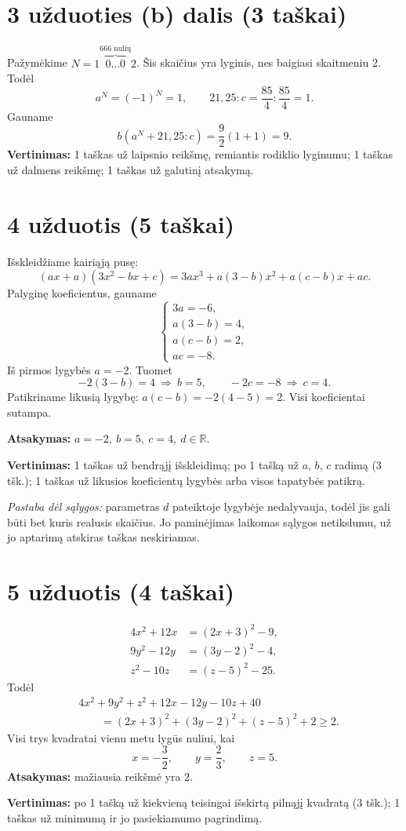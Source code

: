 \documentclass[12pt,a4paper]{exam}
\begin{document}
\section*{3 užduoties (b) dalis (3 taškai)}
Pažymėkime $N=1\overbrace{0\ldots0}^{666\text{ nulių}}2$. Šis skaičius yra lyginis, nes baigiasi skaitmeniu 2. Todėl
$$a^N=(-1)^N=1,\qquad 21{,}25:c=\frac{85}{4}:\frac{85}{4}=1.$$
Gauname
$$b(a^N+21{,}25:c)=\frac92(1+1)=\boxed9.$$
\textbf{Vertinimas:} 1 taškas už laipsnio reikšmę, remiantis rodiklio lyginumu; 1 taškas už dalmens reikšmę; 1 taškas už galutinį atsakymą.
\section*{4 užduotis (5 taškai)}
Išskleidžiame kairiąją pusę:
$$(ax+a)(3x^2-bx+c)=3ax^3+a(3-b)x^2+a(c-b)x+ac.$$
Palyginę koeficientus, gauname
$$\begin{cases}3a=-6,\\a(3-b)=4,\\a(c-b)=2,\\ac=-8.\end{cases}$$
Iš pirmos lygybės $a=-2$. Tuomet
$$-2(3-b)=4\ \Longrightarrow\ b=5,\qquad -2c=-8\ \Longrightarrow\ c=4.$$
Patikriname likusią lygybę: $a(c-b)=-2(4-5)=2$. Visi koeficientai sutampa.
\par\textbf{Atsakymas:} $\boxed{a=-2,\ b=5,\ c=4,\ d\in\mathbb R}$.
\par\textbf{Vertinimas:} 1 taškas už bendrąjį išskleidimą; po 1 tašką už $a$, $b$, $c$ radimą (3 tšk.); 1 taškas už likusios koeficientų lygybės arba visos tapatybės patikrą.
\par\textit{Pastaba dėl sąlygos:} parametras $d$ pateiktoje lygybėje nedalyvauja, todėl jis gali būti bet kuris realusis skaičius. Jo paminėjimas laikomas sąlygos netikslumu, už jo aptarimą atskiras taškas neskiriamas.
\section*{5 užduotis (4 taškai)}
\begin{align*}
4x^2+12x&=(2x+3)^2-9,\\
9y^2-12y&=(3y-2)^2-4,\\
z^2-10z&=(z-5)^2-25.
\end{align*}
Todėl
\begin{align*}
&4x^2+9y^2+z^2+12x-12y-10z+40\\
&\qquad=(2x+3)^2+(3y-2)^2+(z-5)^2+2\geq2.
\end{align*}
Visi trys kvadratai vienu metu lygūs nuliui, kai
$$x=-\frac32,\qquad y=\frac23,\qquad z=5.$$
\textbf{Atsakymas:} mažiausia reikšmė yra $\boxed2$.
\par\textbf{Vertinimas:} po 1 tašką už kiekvieną teisingai išskirtą pilnąjį kvadratą (3 tšk.); 1 taškas už minimumą ir jo pasiekiamumo pagrindimą.
\end{document}
